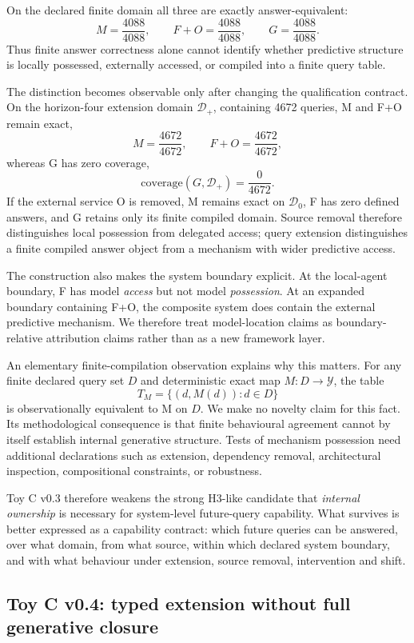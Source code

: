 \documentclass[10pt]{article}
\begin{document}
On the declared finite domain all three are exactly answer-equivalent:
\[
M=\frac{4088}{4088},
\qquad
F+O=\frac{4088}{4088},
\qquad
G=\frac{4088}{4088}.
\]
Thus finite answer correctness alone cannot identify whether predictive structure is locally possessed, externally accessed, or compiled into a finite query table.

The distinction becomes observable only after changing the qualification contract. On the horizon-four extension domain $\mathcal D_+$, containing 4672 queries, M and F+O remain exact,
\[
M=\frac{4672}{4672},
\qquad
F+O=\frac{4672}{4672},
\]
whereas G has zero coverage,
\[
\mathrm{coverage}(G,\mathcal D_+)=\frac{0}{4672}.
\]
If the external service O is removed, M remains exact on $\mathcal D_0$, F has zero defined answers, and G retains only its finite compiled domain. Source removal therefore distinguishes local possession from delegated access; query extension distinguishes a finite compiled answer object from a mechanism with wider predictive access.

The construction also makes the system boundary explicit. At the local-agent boundary, F has model \emph{access} but not model \emph{possession}. At an expanded boundary containing F+O, the composite system does contain the external predictive mechanism. We therefore treat model-location claims as boundary-relative attribution claims rather than as a new framework layer.

An elementary finite-compilation observation explains why this matters. For any finite declared query set $D$ and deterministic exact map $M:D\to\mathcal Y$, the table
\[
T_M=\{(d,M(d)):d\in D\}
\]
is observationally equivalent to M on $D$. We make no novelty claim for this fact. Its methodological consequence is that finite behavioural agreement cannot by itself establish internal generative structure. Tests of mechanism possession need additional declarations such as extension, dependency removal, architectural inspection, compositional constraints, or robustness.

Toy C v0.3 therefore weakens the strong H3-like candidate that \emph{internal ownership} is necessary for system-level future-query capability. What survives is better expressed as a capability contract: which future queries can be answered, over what domain, from what source, within which declared system boundary, and with what behaviour under extension, source removal, intervention and shift.


\subsection{Toy C v0.4: typed extension without full generative closure}
\end{document}
